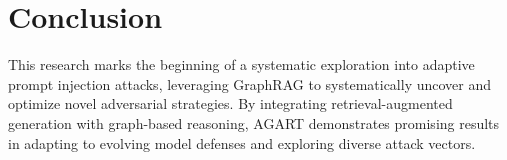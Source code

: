 \section{Conclusion}

This research marks the beginning of a systematic exploration into adaptive prompt injection attacks, leveraging GraphRAG to systematically uncover and optimize novel adversarial strategies. By integrating retrieval-augmented generation with graph-based reasoning, AGART demonstrates promising results in adapting to evolving model defenses and exploring diverse attack vectors.

